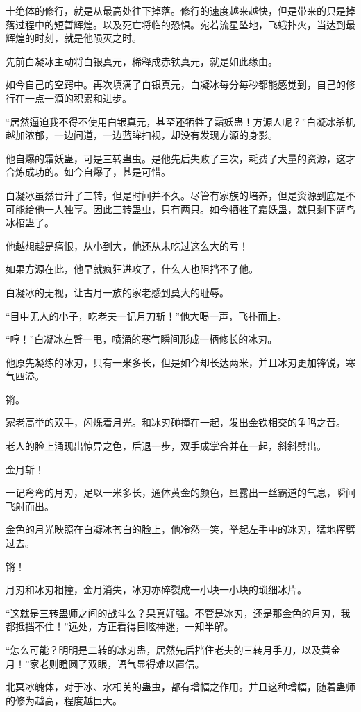 \begin{this_body}
十绝体的修行，就是从最高处往下掉落。修行的速度越来越快，但是带来的只是掉落过程中的短暂辉煌。以及死亡将临的恐惧。宛若流星坠地，飞蛾扑火，当达到最辉煌的时刻，就是他陨灭之时。

先前白凝冰主动将白银真元，稀释成赤铁真元，就是如此缘由。

如今自己的空窍中。再次填满了白银真元，白凝冰每分每秒都能感觉到，自己的修行在一点一滴的积累和进步。

“居然逼迫我不得不使用白银真元，甚至还牺牲了霜妖蛊！方源人呢？”白凝冰杀机越加浓郁，一边问道，一边蓝眸扫视，却没有发现方源的身影。

他自爆的霜妖蛊，可是三转蛊虫。是他先后失败了三次，耗费了大量的资源，这才合炼成功的。如今自爆了，甚是可惜。

白凝冰虽然晋升了三转，但是时间并不久。尽管有家族的培养，但是资源到底是不可能给他一人独享。因此三转蛊虫，只有两只。如今牺牲了霜妖蛊，就只剩下蓝鸟冰棺蛊了。

他越想越是痛恨，从小到大，他还从未吃过这么大的亏！

如果方源在此，他早就疯狂进攻了，什么人也阻挡不了他。

白凝冰的无视，让古月一族的家老感到莫大的耻辱。

“目中无人的小子，吃老夫一记月刀斩！”他大喝一声，飞扑而上。

“哼！”白凝冰左臂一甩，喷涌的寒气瞬间形成一柄修长的冰刃。

他原先凝练的冰刃，只有一米多长，但是如今却长达两米，并且冰刃更加锋锐，寒气四溢。

锵。

家老高举的双手，闪烁着月光。和冰刃碰撞在一起，发出金铁相交的争鸣之音。

老人的脸上涌现出惊异之色，后退一步，双手成掌合并在一起，斜斜劈出。

金月斩！

一记弯弯的月刃，足以一米多长，通体黄金的颜色，显露出一丝霸道的气息，瞬间飞射而出。

金色的月光映照在白凝冰苍白的脸上，他冷然一笑，举起左手中的冰刃，猛地挥劈过去。

锵！

月刃和冰刃相撞，金月消失，冰刃亦碎裂成一小块一小块的琐细冰片。

“这就是三转蛊师之间的战斗么？果真好强。不管是冰刃，还是那金色的月刃，我都抵挡不住！”远处，方正看得目眩神迷，一知半解。

“怎么可能？明明是二转的冰刃蛊，居然先后挡住老夫的三转月手刀，以及黄金月！”家老则瞪圆了双眼，语气显得难以置信。

北冥冰魄体，对于冰、水相关的蛊虫，都有增幅之作用。并且这种增幅，随着蛊师的修为越高，程度越巨大。


\end{this_body}
